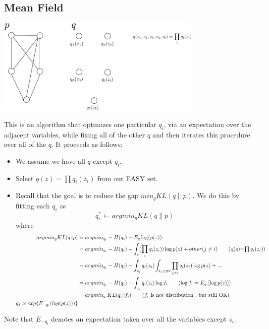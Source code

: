 \documentclass{article}
\begin{document}
\subsection{Mean Field}
\centerline{\includegraphics[width=0.75\textwidth]{fig/mean_field.pdf}}
This is an algorithm that optimizes one particular $q_i$, via an expectation over the adjacent variables, while fixing all of the other $q$ and then iterates this procedure over all of the $q$.  It proceeds as follows:
\begin{itemize}
\item We assume we have all $q$ except $q_i$.
\item Select $q(z) = \prod q_i (z_i)$ from our EASY set.
\item Recall that the goal is to reduce the gap $min_q KL(q\|p)$.  We do this by fitting each $q_i$ as
$$q_{i}^* \leftarrow argmin_q KL(q\|p)$$
where
\begin{align*}
argmin_q KL(q\|p) &= argmin_{q_i} -H(q_i)-E_q \log(p(z)) \\
& = argmin_{q_i} -H(q_i)-\int_z (\prod_i q_i (z_i))\log p(z) + other (j\neq i) \tag{q(z)=$\prod q_i(z_i)$} \\
&= argmin_{q_i} -H(q_i)-\int_{z_i} q_i(z_i) \int_{z_j: j\neq i} \prod_{j \neq i} q_i(z_i)\log p(z) + ... \\
&= argmin_{q_i} -H(q_i) - \int_{z_i} q_i(z_i) \log f_i \tag{$\log f_i= E_{q_i}[\log p(z)]$} \\
&= argmin_{q_i} KL(q_i \| f_i) \tag{$f_i$ is not distribution , but still OK}\\
q_i\propto exp\{E_{-q_i}(log(p(z)))\}
\end{align*}
\end{itemize}

Note that $E_{-q_i}$ denotes an expectation taken over all the variables except $z_i$.  
\end{document}
